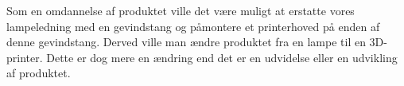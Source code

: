Som en omdannelse af produktet ville det være muligt at erstatte vores lampeledning med en gevindstang og påmontere et printerhoved på enden af denne gevindstang. Derved ville man ændre produktet fra en lampe til en 3D-printer. Dette er dog mere en ændring end det er en udvidelse eller en udvikling af produktet.    
